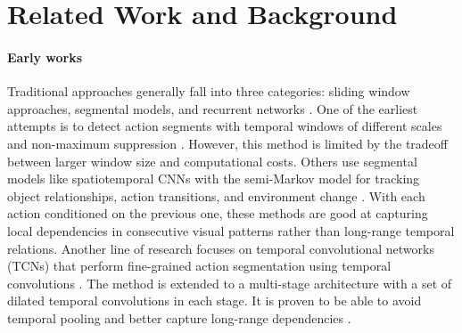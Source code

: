 \newcommand{\red}[1]{{\color{red}{#1}}}


\section{Related Work and Background}


\paragraph{Early works}
Traditional approaches generally fall into three categories: sliding window approaches, segmental models, and recurrent networks \cite{graphbased2020}. One of the earliest attempts is to detect action segments with temporal windows of different scales and non-maximum suppression \cite{6247801}. However, this method is limited by the tradeoff between larger window size and computational costs. Others use segmental models like spatiotemporal CNNs with the semi-Markov model for tracking object relationships, action transitions, and environment change \cite{lea2016segmental, 6619177}. With each action conditioned on the previous one, these methods are good at capturing local dependencies in consecutive visual patterns rather than long-range temporal relations. Another line of research focuses on temporal convolutional networks (TCNs) that perform fine-grained action segmentation using temporal convolutions \cite{8099596}. The method is extended to a multi-stage architecture with a set of dilated temporal convolutions in each stage. It is proven to be able to avoid temporal pooling and better capture long-range dependencies \cite{8953830}. 

